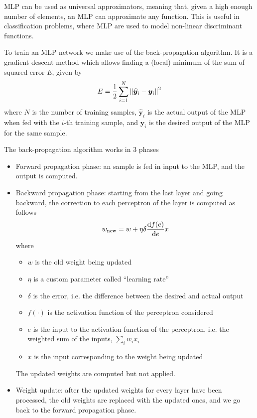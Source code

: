 \documentclass[oneside,onecolumn]{report}
\begin{document}
MLP can be used as universal approximators, meaning that, given a high enough number of elements, an MLP can approximate any function.
This is useful in classification problems, where MLP are used to model non-linear discriminant functions.

To train an MLP network we make use of the back-propagation algorithm.
It is a gradient descent method which allows finding a (local) minimum of the sum of squared error $E$, given by
$$ E = \frac{1}{2} \sum_{i = 1}^N \norm{\widehat{\bm {y}}_i - \bm y_i}^2 $$
where $N$ is the number of training samples, $\widehat{\bm {y}}_i$ is the actual output of the MLP when fed with the $i$-th training sample, and $\bm y_i$ is the desired output of the MLP for the same sample.

The back-propagation algorithm works in 3 phases
\begin{itemize}
    \item Forward propagation phase: an sample is fed in input to the MLP, and the output is computed.

    \item Backward propagation phase: starting from the last layer and going backward, the correction to each perceptron of the layer is computed as follows
    $$ w_\text{new} = w + \eta \delta \dv{f(e)}{e} x $$
    where
    \begin{itemize}
        \item $w$ is the old weight being updated
        \item $\eta$ is a custom parameter called ``learning rate''
        \item $\delta$ is the error, i.e. the difference between the desired and actual output
        \item $f(\cdot)$ is the activation function of the perceptron considered
        \item $e$ is the input to the activation function of the perceptron, i.e. the weighted sum of the inputs, $\sum_{i} w_i x_i$
        \item $x$ is the input corresponding to the weight being updated
    \end{itemize}

    The updated weights are computed but not applied.

    \item Weight update: after the updated weights for every layer have been processed, the old weights are replaced with the updated ones, and we go back to the forward propagation phase.
\end{itemize}
\end{document}
